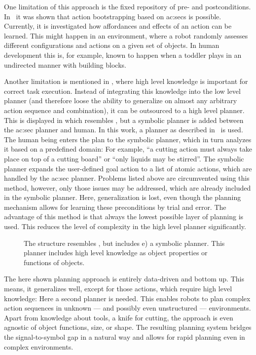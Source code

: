 One limitation of this approach is the fixed repository of pre- and postconditions. 
In~\cite{aksoytamosiunaitevuga2013} it was shown that action bootstrapping based on \glspl{ac:sec} is possible. 
Currently, it is investigated how affordances and effects of an action can be learned.
This might happen in an environment, where a robot randomly assesses different configurations and actions on a given set of objects.
In human development this is, for example, known to happen when a toddler plays in an undirected manner with building blocks.

Another limitation is mentioned in , where high level knowledge is important for correct task execution.
Instead of integrating this knowledge into the low level planner (and therefore loose the ability to generalize on almost any arbitrary action sequence and combination), it can be outsourced to a high level planner.
This is displayed in  which resembles , but  a symbolic planner is added between the \gls{ac:sec} planner and human.
In this work, a planner as described in~\cite{agostinitorraswoergoetter2017} is used.
The human being enters the plan to the symbolic planner, which in turn analyzes it based on a predefined domain: For example, ``a cutting action must always take place on top of a cutting board'' or ``only liquids may be stirred''.
The symbolic planner expands the user-defined goal action to a list of atomic actions, which are handled by the \gls{ac:sec} planner.
Problems listed above are circumvented using this method, however, only those issues may be addressed, which are already included in the symbolic planner.
Here, generalization is lost, even though the planning mechanism allows for learning these preconditions by trial and error.
The advantage of this method is that always the lowest possible layer of planning is used.
This reduces the level of complexity in the high level planner significantly.

\begin{figure}[]
  \centering
  
  \caption{The structure resembles , but includes e) a symbolic planner. This planner includes high level knowledge as object properties or functions of objects.}
  \label{fig:sec_usingaffordanceforplanning_plannerstructurewithhighlevel}
\end{figure}

The here shown planning approach is entirely data-driven and bottom up.
This means, it generalizes well, except for those actions, which require high level knowledge: Here a second planner is needed.
This enables robots to plan complex action sequences in unknown --- and possibly even unstructured --- environments.
Apart from knowledge about tools, \eg a knife for cutting, the approach is even agnostic of object functions, size, or shape.
The resulting planning system bridges the signal-to-symbol gap in a natural way and allows for rapid planning even in complex environments.
